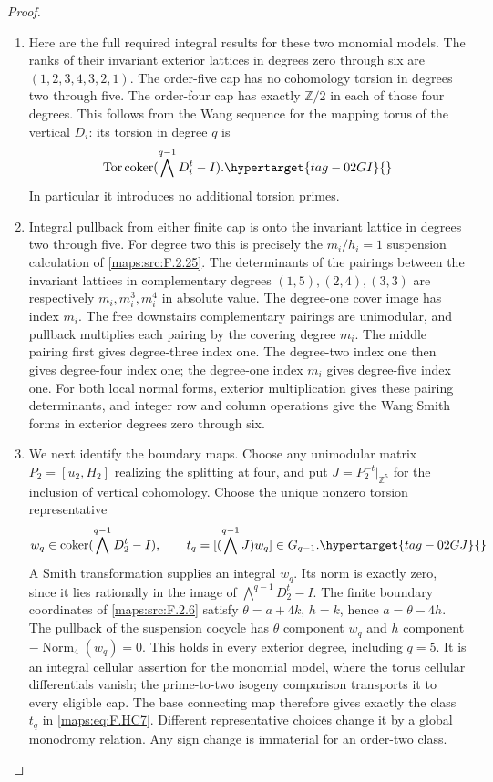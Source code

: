 \documentclass[11pt,a4paper]{article}
\numberwithin{equation}{section}
\theoremstyle{definition}
\begin{document}
\begin{proof}
\begin{enumerate}[label=\arabic*.]
\item Here are the full required integral results for these
two monomial models.
The ranks of their invariant exterior lattices in
degrees zero through six are
$(1,2,3,4,3,2,1)$.
The order-five cap has no cohomology torsion in degrees
two through five.
The order-four cap has exactly $\mathbb Z/2$ in each
of those four degrees.
This follows from the Wang sequence for the mapping
torus of the vertical $D_i$:
its torsion in degree $q$ is
\begin{equation}
 \operatorname{Tor}\operatorname{coker}
       (\bigwedge^{q-1}D_i^t-I).
 \hypertarget{tag-02GI}{}\label{maps:eq:F.HC6}
\end{equation}
In particular it introduces no additional torsion primes.

\item Integral pullback from either finite cap is onto the
invariant lattice in degrees two through five.
For degree two this is precisely the $m_i/h_i=1$
suspension calculation of \ref{maps:src:F.2.25}.
The determinants of the pairings between
the invariant lattices in complementary degrees
$(1,5),(2,4),(3,3)$ are respectively
$m_i,m_i^3,m_i^4$ in absolute value.
The degree-one cover image has index $m_i$.
The free downstairs complementary pairings are unimodular,
and pullback multiplies each pairing by the covering
degree $m_i$.
The middle pairing first gives degree-three index one.
The degree-two index one then gives degree-four index one;
the degree-one index $m_i$ gives degree-five index one.
For both local normal forms, exterior multiplication gives these
pairing determinants, and integer row and column operations give the
Wang Smith forms in exterior degrees zero through six.

\item We next identify the boundary maps.
Choose any unimodular matrix $P_2=[u_2,H_2]$ realizing
the splitting at four, and put
$J=P_2^{-t}|_{\mathbb Z^5}$ for the inclusion of vertical
cohomology.
Choose the unique nonzero torsion representative
\begin{equation}
 w_q\in\operatorname{coker}
            (\bigwedge^{q-1}D_2^t-I),\qquad
 t_q=[(\bigwedge^{q-1}J)w_q]\in G_{q-1}.
 \hypertarget{tag-02GJ}{}\label{maps:eq:F.HC7}
\end{equation}
A Smith transformation supplies an integral $w_q$.
Its norm is exactly zero, since it lies rationally in
the image of $\bigwedge^{q-1}D_2^t-I$.
The finite boundary coordinates of \ref{maps:src:F.2.6} satisfy
$\theta=a+4k$, $h=k$, hence $a=\theta-4h$.
The pullback of the suspension cocycle has $\theta$
component $w_q$ and $h$ component
$-\operatorname{Norm}_4(w_q)=0$.
This holds in every exterior degree, including $q=5$.
It is an integral cellular assertion for the monomial
model, where the torus cellular differentials vanish;
the prime-to-two isogeny comparison transports it to
every eligible cap.
The base connecting map therefore gives exactly the
class $t_q$ in \eqref{maps:eq:F.HC7}.
Different representative choices change it by a global
monodromy relation.  Any sign change is immaterial for
an order-two class.


\end{enumerate}
\end{proof}
\end{document}
